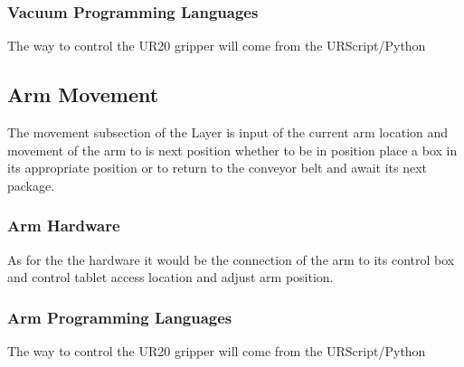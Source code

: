 \subsubsection{Vacuum Programming Languages}
The way to control the UR20 gripper will come from the URScript/Python

\subsection{Arm Movement}
The movement subsection of the Layer is input of the current arm location and movement of the arm to is next position whether to be in position place a box in its appropriate position or to return to the conveyor belt and await its next package.

\subsubsection{Arm Hardware}
As for the the hardware it would be the connection of the arm to its control box and control tablet access location and adjust arm position. 

\subsubsection{Arm Programming Languages}
The way to control the UR20 gripper will come from the URScript/Python
